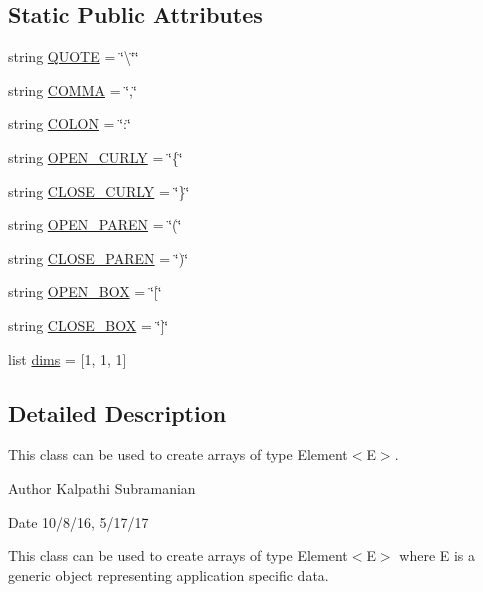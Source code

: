 \subsection*{Static Public Attributes}
\begin{DoxyCompactItemize}
\item 
string \hyperlink{classbridges_1_1array_1_1_array_a8777c1e64d0566b38f049d4fb04b0217}{Q\+U\+O\+T\+E} = \char`\"{}\textbackslash{}\char`\"{}\char`\"{}
\item 
string \hyperlink{classbridges_1_1array_1_1_array_a48f7cf1e3f79a6d6b2ea60eb8c0374c4}{C\+O\+M\+M\+A} = \char`\"{},\char`\"{}
\item 
string \hyperlink{classbridges_1_1array_1_1_array_afdb64db04a0fa0e64cfbbe5e0fbe35fa}{C\+O\+L\+O\+N} = \char`\"{}\+:\char`\"{}
\item 
string \hyperlink{classbridges_1_1array_1_1_array_abc538c305e450654358e2cc5513e6972}{O\+P\+E\+N\+\_\+\+C\+U\+R\+L\+Y} = \char`\"{}\{\char`\"{}
\item 
string \hyperlink{classbridges_1_1array_1_1_array_a1f32cb5408d56eb19ac8d2b8c90f2c49}{C\+L\+O\+S\+E\+\_\+\+C\+U\+R\+L\+Y} = \char`\"{}\}\char`\"{}
\item 
string \hyperlink{classbridges_1_1array_1_1_array_aeb428b63e66c14d1fdb9f40c90e9f6c3}{O\+P\+E\+N\+\_\+\+P\+A\+R\+E\+N} = \char`\"{}(\char`\"{}
\item 
string \hyperlink{classbridges_1_1array_1_1_array_a5c272b32050b25c878b4d872f4e2cb1e}{C\+L\+O\+S\+E\+\_\+\+P\+A\+R\+E\+N} = \char`\"{})\char`\"{}
\item 
string \hyperlink{classbridges_1_1array_1_1_array_a56bcd6a1eff64f04aba01c667111122b}{O\+P\+E\+N\+\_\+\+B\+O\+X} = \char`\"{}\mbox{[}\char`\"{}
\item 
string \hyperlink{classbridges_1_1array_1_1_array_a552363bc0dc8c8dbb2a9204cc98a767e}{C\+L\+O\+S\+E\+\_\+\+B\+O\+X} = \char`\"{}\mbox{]}\char`\"{}
\item 
list \hyperlink{classbridges_1_1array_1_1_array_a69f2c673a6077e203b3e916dd73cd243}{dims} = \mbox{[}1, 1, 1\mbox{]}
\end{DoxyCompactItemize}


\subsection{Detailed Description}
This class can be used to create arrays of type Element$<$\+E$>$. 

\begin{DoxyAuthor}{Author}
Kalpathi Subramanian
\end{DoxyAuthor}
\begin{DoxyDate}{Date}
10/8/16, 5/17/17
\end{DoxyDate}
This class can be used to create arrays of type Element$<$\+E$>$ where E is a generic object representing application specific data.

